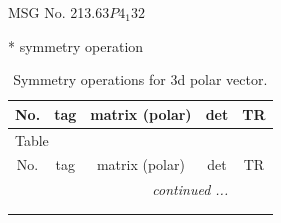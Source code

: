 \documentclass[fleqn,8pt]{jsarticle}
\begin{document}
\setcounter{MaxMatrixCols}{32}

\renewcommand{\tablename}{Table~}
\renewcommand{\figurename}{Figure~}
\begin{center}
\LARGE
MSG No. 213.63\quad$P4_{1}32$
\end{center}
* symmetry operation
\renewcommand{\arraystretch}{1.3}
\begin{longtable}{ccccc}
\caption{Symmetry operations for 3d polar vector.}
 \\
 \hline \hline
No. & tag & matrix (polar) & det & TR \\ \hline \endfirsthead

\multicolumn{4}{l}{\tablename\ \thetable{}} \\
 \hline \hline
No. & tag & matrix (polar) & det & TR \\ \hline \endhead

 \hline \hline
\multicolumn{4}{r}{\footnotesize\it continued ...} \\ \endfoot

 \hline \hline
\multicolumn{4}{r}{} \\ \endlastfoot


\end{longtable}
\end{document}
